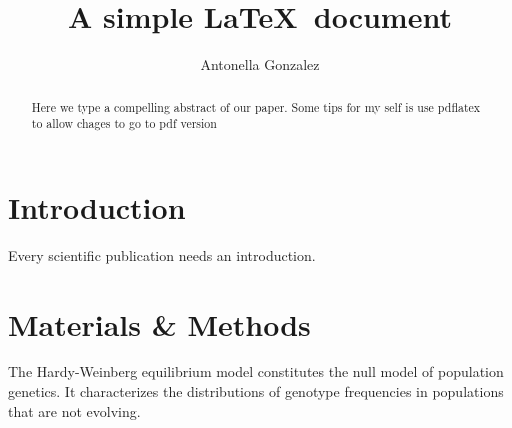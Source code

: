 \documentclass[12pt]{article}
\title{A simple \LaTeX\ document}
\author{Antonella Gonzalez}
\date{}
\begin{document}
\maketitle
\begin{abstract}
Here we type a compelling abstract of our paper. Some tips for my self is use pdflatex to allow chages to go to pdf version
\end{abstract}
\section{Introduction}
Every scientific publication needs an introduction.
\section{Materials \& Methods}
The Hardy-Weinberg equilibrium model constitutes the null model of population genetics. It characterizes the distributions of genotype  frequencies in populations that are not evolving.
\end{document}
